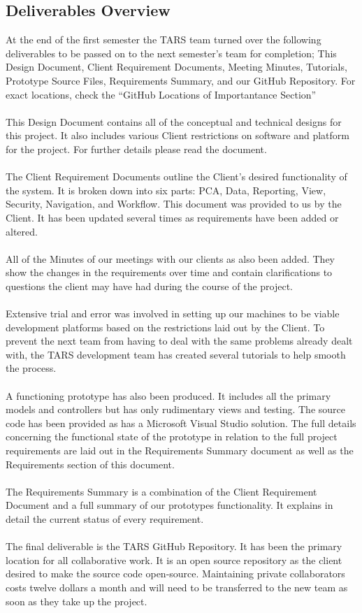 \documentclass[letterpaper]{article}
\begin{document}
\subsection{Deliverables Overview}
At the end of the first semester the TARS team turned over the following deliverables to be passed on to the next semester's team for completion; This Design Document, Client Requirement Documents, Meeting Minutes, Tutorials, Prototype Source Files, Requirements Summary, and our GitHub Repository. For exact locations, check the ``GitHub Locations of Importantance Section''\\
\\
This Design Document contains all of the conceptual and technical designs for this project.  It also includes various Client restrictions on software and platform for the project.  For further details please read the document.\\
\\
The Client Requirement Documents outline the Client's desired functionality of the system.  It is broken down into six parts: PCA, Data, Reporting, View, Security, Navigation, and Workflow.  This document was provided to us by the Client.  It has been updated several times as requirements have been added or altered.\\
\\
All of the Minutes of our meetings with our clients as also been added.  They show the changes in the requirements over time and contain clarifications to questions the client may have had during the course of the project.\\
\\
Extensive trial and error was involved in setting up our machines to be viable development platforms based on the restrictions laid out by the Client.  To prevent the next team from having to deal with the same problems already dealt with, the TARS development team has created several tutorials to help smooth the process.\\
\\
A functioning prototype has also been produced.  It includes all the primary models and controllers but has only rudimentary views and testing.  The source code has been provided as has a Microsoft Visual Studio solution.  The full details concerning the functional state of the prototype in relation to the full project requirements are laid out in the Requirements Summary document as well as the Requirements section of this document.\\
\\
The Requirements Summary is a combination of the Client Requirement Document and a full summary of our prototypes functionality.  It explains in detail the current status of every requirement.\\
\\
The final deliverable is the TARS GitHub Repository.  It has been the primary location for all collaborative work.  It is an open source repository as the client desired to make the source code open-source.  Maintaining private collaborators costs twelve dollars a month and will need to be transferred to the new team as soon as they take up the project.\\
\\
\pagebreak
\end{document}
